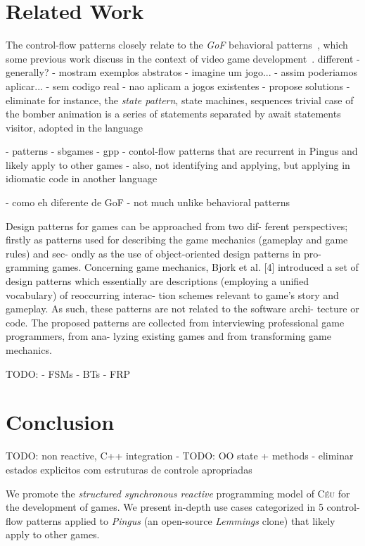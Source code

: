\documentclass{vgtc}                          %
\newcommand{\CEU}{\textsc{C\'{e}u}\xspace}
\begin{document}
\section{Related Work}
\label{sec.related}

The control-flow patterns closely relate to the \emph{GoF} behavioral
patterns~\cite{gof}, which some previous work discuss in the context of video
game development~\cite{a,b,c}.
%
different
    - generally?
        - mostram exemplos abstratos
            - imagine um jogo...
                - assim poderiamos aplicar...
            - sem codigo real
            - nao aplicam a jogos existentes
    - propose solutions
        - eliminate
for instance, the \emph{state pattern}, state machines, sequences
trivial case of the bomber animation is a series of statements separated
by await statements
visitor, adopted in the language

- patterns
    - sbgames
    - gpp   
- contol-flow patterns that are recurrent in Pingus and likely apply to other
games
- also, not identifying and applying, but applying in idiomatic code in another
  language

    - como eh diferente de GoF
        - not much unlike behavioral patterns

Design patterns for games can be approached from two dif-
ferent perspectives; firstly as patterns used for describing
the game mechanics (gameplay and game rules) and sec-
ondly as the use of object-oriented design patterns in pro-
gramming games.
Concerning game mechanics, Bjork et al. [4] introduced
a set of design patterns which essentially are descriptions
(employing a unified vocabulary) of reoccurring interac-
tion schemes relevant to game’s story and gameplay. As
such, these patterns are not related to the software archi-
tecture or code. The proposed patterns are collected from
interviewing professional game programmers, from ana-
lyzing existing games and from transforming game
mechanics.

TODO:
    - FSMs
    - BTs
    - FRP

\section{Conclusion}
\label{sec.conclusion}

TODO: non reactive, C++ integration
- TODO: OO state + methods
- eliminar estados explicitos com estruturas de controle apropriadas

We promote the \emph{structured synchronous reactive} programming model of
\CEU for the development of games.
We present in-depth use cases categorized in 5 control-flow patterns applied to
\emph{Pingus} (an open-source \emph{Lemmings} clone) that likely apply to other
games.
\end{document}
